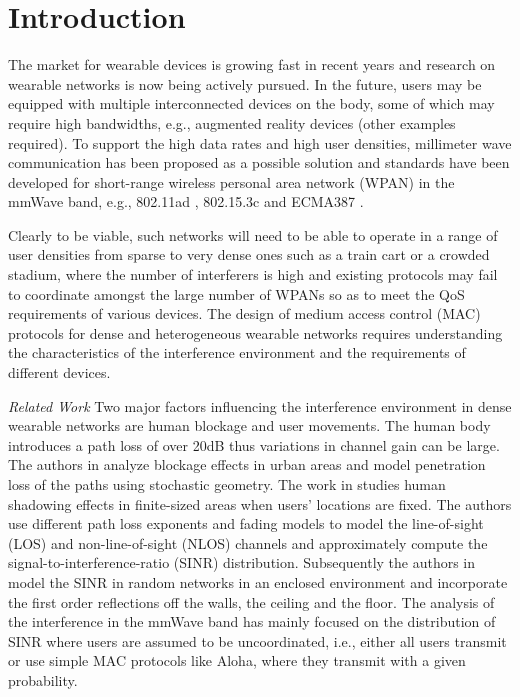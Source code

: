 \documentclass[10pt, conference, letterpaper]{IEEEtran}
\begin{document}
\section{Introduction}\label{section:introduction}

The market for wearable devices is growing fast in recent years \cite{wearable} and research on wearable networks is now being actively pursued. In the future, users may be equipped with multiple interconnected devices on the body, some of which may require high bandwidths, e.g., augmented reality devices (other examples required). To support the high data rates and high user densities, millimeter wave communication has been proposed as a possible solution and standards have been developed for short-range wireless personal area network (WPAN) in the mmWave band, e.g., 802.11ad \cite{80211ad}, 802.15.3c \cite{802153c} and ECMA387 \cite{ECMA387}. 

Clearly to be viable, such networks will need to be able to operate in a range of user densities from sparse to very dense ones such as a train cart or a crowded stadium, where the number of interferers is high and existing protocols may fail to coordinate amongst the large number of WPANs so as to meet the QoS requirements of various devices. The design of medium access control (MAC) protocols for dense and heterogeneous wearable networks requires understanding the characteristics of the interference environment and the requirements of different devices.

\emph{Related Work}
Two major factors influencing the interference environment in dense wearable networks are human blockage and user movements. The human body introduces a path loss of over 20dB \cite{humanshadowing} thus variations in channel gain can be large. The authors in \cite{urbanblockage} analyze blockage effects in urban areas and model penetration loss of the paths using stochastic geometry. The work in \cite{interferencefinitesized} studies human shadowing effects in finite-sized areas when users' locations are fixed. The authors use different path loss exponents and fading models to model the line-of-sight (LOS) and non-line-of-sight (NLOS) channels and approximately compute the signal-to-interference-ratio (SINR) distribution. Subsequently the authors in \cite{enclosedmmwave} model the SINR in random networks in an enclosed environment and incorporate the first order reflections off the walls, the ceiling and the floor. The analysis of the interference in the mmWave band has mainly focused on the distribution of SINR where users are assumed to be uncoordinated, i.e., either all users transmit or use simple MAC protocols like Aloha, where they transmit with a given probability. 
\end{document}

